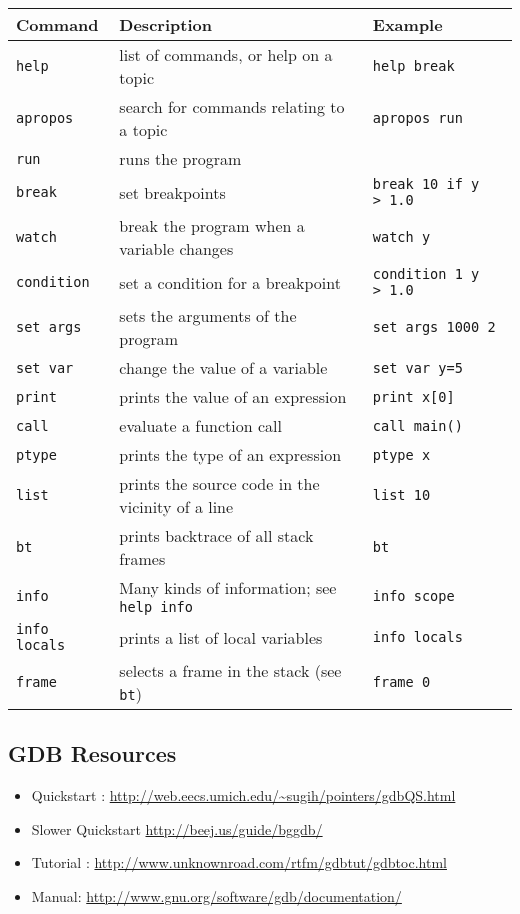 \documentclass[letterpaper,12pt]{article}
\begin{document}
\begin{center}
\begin{tabular}{l l l}
Command & Description & Example\\ \hline
\texttt{help} & list of commands, or help on a topic  & \texttt{help break}\\
\texttt{apropos} & search for commands relating to a topic & \texttt{apropos run}\\
\texttt{run} & runs the program & \\
\texttt{break} & set breakpoints & \texttt{break 10 if y \textgreater\ 1.0 }\\
\texttt{watch} & break the program when a variable changes & \texttt{watch y}\\
\texttt{condition} & set a condition for a breakpoint & \texttt{condition 1 y \textgreater\ 1.0}\\
\texttt{set args} & sets the arguments of the program & \texttt{set args 1000 2}\\
\texttt{set var} & change the value of a variable & \texttt{set var y=5} \\
\texttt{print} & prints the value of an expression & \texttt{print x[0]} \\
\texttt{call} & evaluate a function call & \texttt{call main()} \\
\texttt{ptype} & prints the type of an expression &  \texttt{ptype x}\\
\texttt{list} & prints the source code in the vicinity of a line & \texttt{list 10}\\
\texttt{bt} & prints backtrace of all stack frames & \texttt{bt} \\
\texttt{info} & Many kinds of information; see \texttt{help info} & \texttt{info scope} \\
\texttt{info locals} & prints a list of local variables & \texttt{info locals} \\
\texttt{frame} & selects a frame in the stack (see \texttt{bt}) & \texttt{frame 0} \\
\end{tabular}
\end{center}

\subsection*{GDB Resources}
\begin{itemize}
\item Quickstart : \url{http://web.eecs.umich.edu/~sugih/pointers/gdbQS.html}
\item Slower Quickstart \url{http://beej.us/guide/bggdb/}
\item Tutorial : \url{http://www.unknownroad.com/rtfm/gdbtut/gdbtoc.html}
\item Manual: \url{http://www.gnu.org/software/gdb/documentation/}
\end{itemize}
\end{document}
